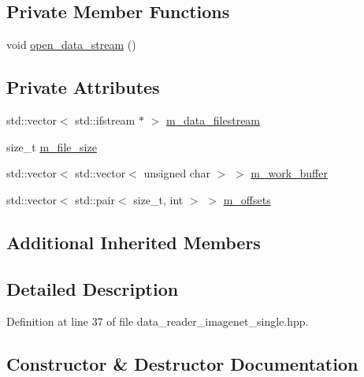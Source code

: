 \subsection*{Private Member Functions}
\begin{DoxyCompactItemize}
\item 
void \hyperlink{classlbann_1_1imagenet__reader__single_a8db14d15bfc2de92ffb3c20f1a38dd00}{open\+\_\+data\+\_\+stream} ()
\end{DoxyCompactItemize}
\subsection*{Private Attributes}
\begin{DoxyCompactItemize}
\item 
std\+::vector$<$ std\+::ifstream $\ast$ $>$ \hyperlink{classlbann_1_1imagenet__reader__single_af617e1b0b019049682db6de6e01b05ca}{m\+\_\+data\+\_\+filestream}
\item 
size\+\_\+t \hyperlink{classlbann_1_1imagenet__reader__single_aa1a20a782f97e697d9d70371a5e33384}{m\+\_\+file\+\_\+size}
\item 
std\+::vector$<$ std\+::vector$<$ unsigned char $>$ $>$ \hyperlink{classlbann_1_1imagenet__reader__single_a499b197f1d985b592801de9adfe2d2f5}{m\+\_\+work\+\_\+buffer}
\item 
std\+::vector$<$ std\+::pair$<$ size\+\_\+t, int $>$ $>$ \hyperlink{classlbann_1_1imagenet__reader__single_a605ba53f4e3fa02a4fced38d41465a10}{m\+\_\+offsets}
\end{DoxyCompactItemize}
\subsection*{Additional Inherited Members}


\subsection{Detailed Description}


Definition at line 37 of file data\+\_\+reader\+\_\+imagenet\+\_\+single.\+hpp.



\subsection{Constructor \& Destructor Documentation}
\mbox{\label{classlbann_1_1imagenet__reader__single_ac42ce78ac5d191d571443dfea1f9d2ec}} 
